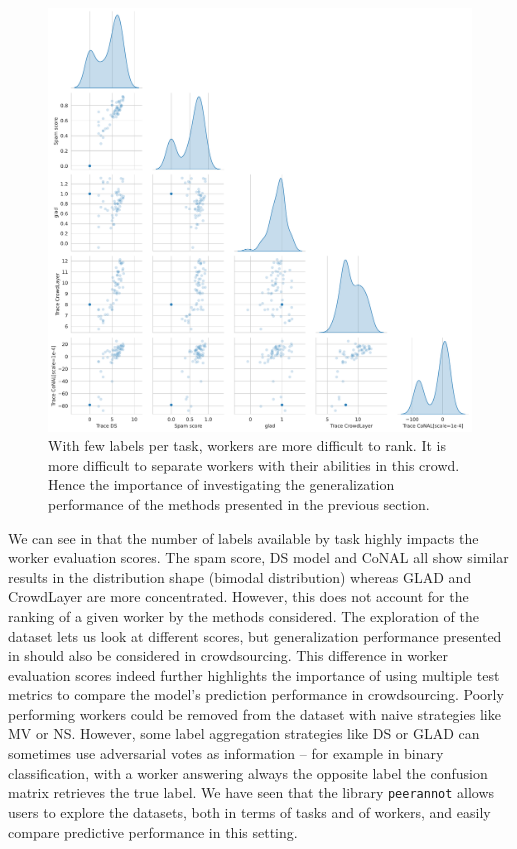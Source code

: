 \begin{figure}[tbh]
    \centering
    \includegraphics[width=.95\textwidth]{./images_peerannot/fig-abilities-labelme-output-1.pdf}
    \caption{With few labels per task, workers are more difficult to rank. It is more difficult to separate workers with their abilities in this crowd. Hence the importance of investigating the generalization performance of the methods presented in the previous section.}
    \label{fig:abilitieslabelme}
\end{figure}

We can see in  that the number of labels available by task highly impacts the worker evaluation scores.
The spam score, DS model and CoNAL all show similar results in the distribution shape (bimodal distribution) whereas GLAD and CrowdLayer are more concentrated.
However, this does not account for the ranking of a given worker by the methods considered.
The exploration of the dataset lets us look at different scores, but generalization performance presented in  should also be considered in crowdsourcing.
This difference in worker evaluation scores indeed further highlights the importance of using multiple test metrics to compare the model's prediction performance in crowdsourcing.
Poorly performing workers could be removed from the dataset with naive strategies like MV or NS.
However, some label aggregation strategies like DS or GLAD can sometimes use adversarial votes as information -- for example in binary classification, with a worker answering always the opposite label the confusion matrix retrieves the true label.
We have seen that the library \texttt{peerannot} allows users to explore the datasets, both in terms of tasks and of workers, and easily compare predictive performance in this setting.

